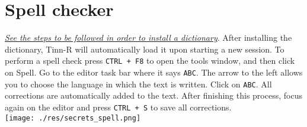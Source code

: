 
\section{Spell checker}

\textit{\href{\#configuration\_spellerinstalation}{See the steps to be followed in order to install a dictionary}}.
After installing the dictionary, Tinn-R will automatically load it upon starting a new session.
To perform a spell check press \texttt{CTRL + F8} to open the tools window, and then click on Spell.
Go to the editor task bar where it says \texttt{ABC}.
The arrow to the left allows you to choose the language in which the text is written.
Click on \texttt{ABC}. All corrections are automatically added to the text. After finishing this process,
focus again on the editor and press \texttt{CTRL + S} to save all corrections.\\

\vspace{5mm}
\texttt{[image: ./res/secrets\_spell.png]}\\
